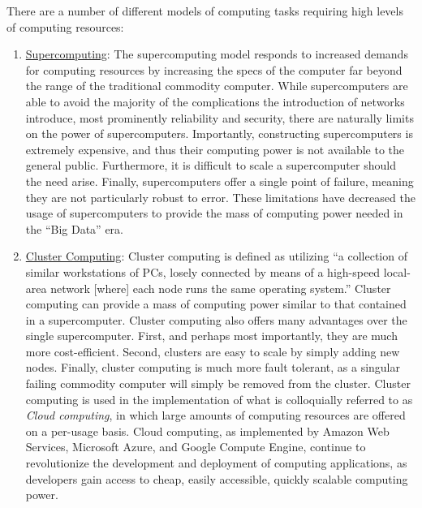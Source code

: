 \documentclass[twoside]{report}
\begin{document}
There are a number of different models of computing tasks requiring high levels
of computing resources:

\begin{enumerate}
  \item \underline{Supercomputing}: The supercomputing model responds to
    increased demands for computing resources by increasing the specs of the
    computer far beyond the range of the traditional commodity computer.
    While supercomputers are able to avoid the majority of the complications the
    introduction of networks introduce, most prominently reliability and
    security, there are naturally limits on the power of supercomputers.
    Importantly, constructing supercomputers is extremely expensive, and thus
    their computing power is not available to the general public. Furthermore,
    it is difficult to scale a supercomputer should the need arise. Finally,
    supercomputers offer a single point of failure, meaning they are not
    particularly robust to error. These limitations have decreased the usage of
    supercomputers to provide the mass of computing power needed in the ``Big
    Data'' era.

  \item \underline{Cluster Computing}: Cluster computing is defined as utilizing
    ``a collection of similar workstations of PCs, losely connected by means of
    a high-speed local-area network [where] each node runs the same operating
    system.''\cite[pg. 17-18]{distributed-systems-principles-and-paradigms}
    Cluster computing can provide a mass of computing power similar to
    that contained in a supercomputer. Cluster computing also offers many
    advantages over the single supercomputer. First, and perhaps most
    importantly, they are much more cost-efficient. Second, clusters are easy to
    scale by simply adding new nodes. Finally, cluster computing is much more fault
    tolerant, as a singular failing commodity computer will simply be removed
    from the cluster. Cluster computing is used in the
    implementation of what is colloquially referred to as \textit{Cloud
    computing}, in which large amounts of computing resources are offered on a
    per-usage basis.\cite[pg. 13]{distributed-systems-concepts-and-design}
    Cloud computing, as implemented by Amazon Web
    Services,\cite{amazon-web-services} Microsoft Azure,\cite{microsoft-azure}
    and Google Compute Engine,\cite{google-compute-engine} continue to
    revolutionize the development and deployment of computing applications, as
    developers gain access to cheap, easily accessible, quickly scalable
    computing power.


\end{enumerate}
\end{document}
